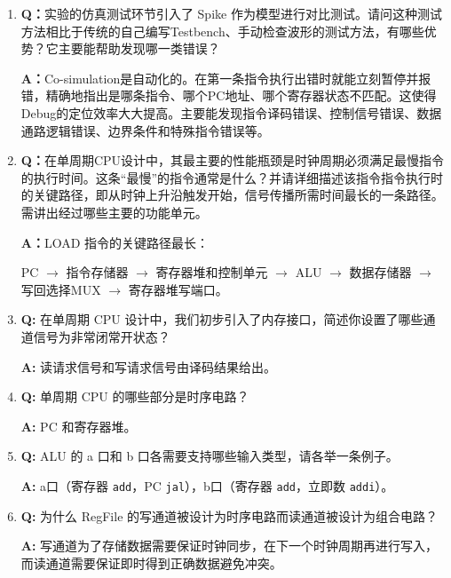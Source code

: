 \begin{enumerate}
    \item \textbf{Q：}实验的仿真测试环节引入了 Spike 作为模型进行对比测试。请问这种测试方法相比于传统的自己编写Testbench、手动检查波形的测试方法，有哪些优势？它主要能帮助发现哪一类错误？
    
    \textbf{A：}Co-simulation是自动化的。在第一条指令执行出错时就能立刻暂停并报错，精确地指出是哪条指令、哪个PC地址、哪个寄存器状态不匹配。这使得Debug的定位效率大大提高。主要能发现指令译码错误、控制信号错误、数据通路逻辑错误、边界条件和特殊指令错误等。

    \item \textbf{Q：}在单周期CPU设计中，其最主要的性能瓶颈是时钟周期必须满足最慢指令的执行时间。这条“最慢”的指令通常是什么？并请详细描述该指令指令执行时的关键路径，即从时钟上升沿触发开始，信号传播所需时间最长的一条路径。需讲出经过哪些主要的功能单元。
    
    \textbf{A：}LOAD 指令的关键路径最长：
    
    PC $\rightarrow$ 指令存储器 $\rightarrow$ 寄存器堆和控制单元 $\rightarrow$ ALU $\rightarrow$ 数据存储器 $\rightarrow$ 写回选择MUX $\rightarrow$ 寄存器堆写端口。

    \item \textbf{Q:} 在单周期 CPU 设计中，我们初步引入了内存接口，简述你设置了哪些通道信号为非常闭常开状态？
    
    \textbf{A:} 读请求信号和写请求信号由译码结果给出。

    \item \textbf{Q:} 单周期 CPU 的哪些部分是时序电路？
    
    \textbf{A:} PC 和寄存器堆。

    \item \textbf{Q:} ALU 的 a 口和 b 口各需要支持哪些输入类型，请各举一条例子。
    
    \textbf{A:} a口（寄存器 \texttt{add}，PC \texttt{jal}），b口（寄存器 \texttt{add}，立即数 \texttt{addi}）。

    \item \textbf{Q:} 为什么 RegFile 的写通道被设计为时序电路而读通道被设计为组合电路？
    
    \textbf{A:} 写通道为了存储数据需要保证时钟同步，在下一个时钟周期再进行写入，而读通道需要保证即时得到正确数据避免冲突。

\end{enumerate}